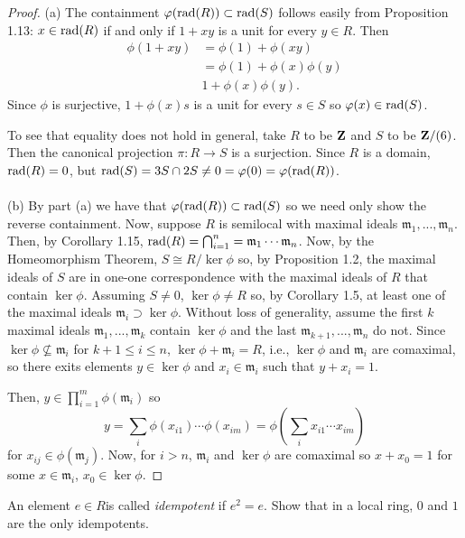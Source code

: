 \begin{proof}
(a) The containment $\varphi(\operatorname{rad}(R))\subset\operatorname{rad}(S)$ follows easily
from Proposition 1.13: $x\in\operatorname{rad}(R)$ if and only if $1+xy$ is a
unit for every $y\in R$. Then
\begin{align*}
\phi(1+xy)&=\phi(1)+\phi(xy)\\
             &=\phi(1)+\phi(x)\phi(y)\\
             &1+\phi(x)\phi(y).
\end{align*}
Since $\phi$ is surjective, $1+\phi(x)s$ is a unit for every
$s\in S$ so $\varphi(x)\in\operatorname{rad}(S)$.

To see that equality does not hold in general, take $R$ to be
$\mathbf{Z}$ and $S$ to be $\mathbf{Z}/(6)$. Then the canonical projection
$\pi\colon R\to S$ is a surjection. Since $R$ is a domain,
$\operatorname{rad}(R)=0$, but $\operatorname{rad}(S)= 3S\cap 2S\neq
0=\varphi(0)=\varphi(\operatorname{rad}(R))$.
\\\\
(b) By part (a) we have that $\varphi(\operatorname{rad}(R))\subset\operatorname{rad}(S)$ so we
need only show the reverse containment. Now, suppose $R$ is
semilocal with maximal ideals
$\mathfrak{m}_1,...,\mathfrak{m}_n$. Then, by Corollary 1.15,
$\operatorname{rad}(R)=\bigcap_{i=1}^n=\mathfrak{m}_1\cdots\mathfrak{m}_n$. Now,
by the Homeomorphism Theorem, $S\cong R/\ker\phi$ so, by
Proposition 1.2, the maximal ideals of $S$ are in one-one
correspondence with the maximal ideals of $R$ that contain
$\ker\phi$. Assuming $S\neq 0$, $\ker\phi\neq R$ so, by Corollary
1.5, at least one of the maximal ideals
$\mathfrak{m}_i\supset\ker\phi$. Without loss of generality,
assume the first $k$ maximal ideals
$\mathfrak{m}_1,...,\mathfrak{m}_k$ contain $\ker\phi$ and the
last $\mathfrak{m}_{k+1},...,\mathfrak{m}_n$ do not. Since
$\ker\phi\nsubseteq\mathfrak{m}_i$ for $k+1\leq i\leq n$,
$\ker\phi+\mathfrak{m}_i=R$, i.e., $\ker\phi$ and
$\mathfrak{m}_i$ are comaximal, so there exits elements
$y\in\ker\phi$ and $x_i\in\mathfrak{m}_i$ such that
$y+x_i=1$.

 Then,
$y\in\prod_{i=1}^m\phi(\mathfrak{m}_i)$
so
\[
y
=
\sum_i\phi(x_{i1})\cdots\phi(x_{im})
=
\phi\left(\sum_i x_{i1}\cdots x_{im}\right)
\]
for $x_{ij}\in\phi(\mathfrak{m}_j)$. Now, for $i>n$,
$\mathfrak{m}_i$ and $\ker\phi$ are comaximal so $x+x_0=1$ for
some $x\in\mathfrak{m}_i$, $x_0\in\ker\phi$.
\end{proof}
\newpage
\begin{problem}
An element $e\in R$is called \emph{idempotent} if $e^2=e$. Show
that in a local ring, $0$ and $1$ are the only idempotents.
\end{problem}
